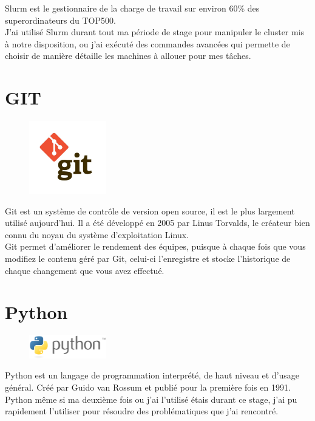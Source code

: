 Slurm est le gestionnaire de la charge de travail sur environ 60\% des superordinateurs du TOP500.\\
J’ai utilisé Slurm durant tout ma période de stage pour manipuler le cluster mis à notre disposition, ou j’ai exécuté des commandes avancées qui permette de choisir de manière détaille les machines à allouer pour mes tâches.

\section{GIT}
\begin{figure}[H]  
 \centering
    \includegraphics[width=0.3\textwidth]{annexe/Figures/git.png}
\end{figure}
Git est un système de contrôle de version open source, il est le plus largement utilisé aujourd'hui. Il a été développé en 2005 par Linus Torvalds, le créateur bien connu du noyau du système d'exploitation Linux.\\
Git permet d’améliorer le rendement des équipes, puisque à chaque fois que vous modifiez le contenu géré par Git, celui-ci l’enregistre et stocke l’historique de chaque changement que vous avez effectué.

\section{Python}
\begin{figure}[H]  
 \centering
    \includegraphics[width=0.3\textwidth]{annexe/Figures/python_logo.png}
\end{figure}
Python est un langage de programmation interprété, de haut niveau et d'usage général. Créé par Guido van Rossum et publié pour la première fois en 1991.\\
Python même si ma deuxième fois ou j’ai l’utilisé étais durant ce stage, j’ai pu rapidement l’utiliser pour résoudre des problématiques que j’ai rencontré.

